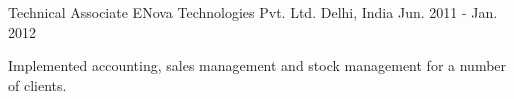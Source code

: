 \begin{cventries}
  \cventry
    {Technical Associate} %
    {ENova Technologies Pvt. Ltd.} %
    {Delhi, India} %
    {Jun. 2011 - Jan. 2012} %
    {
      \begin{cvitems} %
        \item {Implemented accounting, sales management and stock management for a number of clients.}
      \end{cvitems}
    }

\end{cventries}
